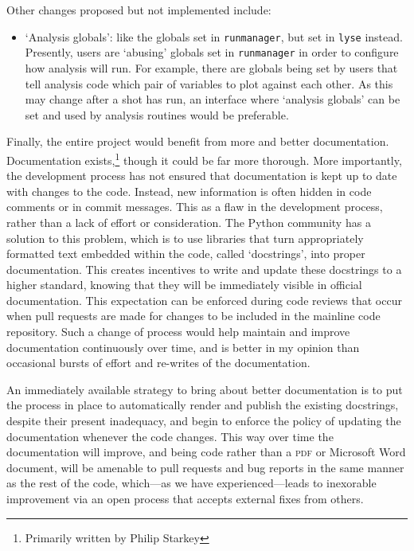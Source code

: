 Other changes proposed but not implemented include:

\begin{itemize}
\item `Analysis globals': like the globals set in \texttt{runmanager}, but set in \texttt{lyse} instead. Presently, users are `abusing' globals set in \texttt{runmanager} in order to configure how analysis will run. For example, there are globals being set by users that tell analysis code which pair of variables to plot against each other. As this may change after a shot has run, an interface where `analysis globals' can be set and used by analysis routines would be preferable.
\end{itemize}

Finally, the entire project would benefit from more and better documentation. Documentation exists,\footnote{Primarily written by Philip Starkey} though it could be far more thorough. More importantly, the development process has not ensured that documentation is kept up to date with changes to the code. Instead, new information is often hidden in code comments or in commit messages. This as a flaw in the development process, rather than a lack of effort or consideration. The Python community has a solution to this problem, which is to use libraries that turn appropriately formatted text embedded within the code, called `docstrings', into proper documentation. This creates incentives to write and update these docstrings to a higher standard, knowing that they will be immediately visible in official documentation. This expectation can be enforced during code reviews that occur when pull requests are made for changes to be included in the mainline code repository. Such a change of process would help maintain and improve documentation continuously over time, and is better in my opinion than occasional bursts of effort and re-writes of the documentation.

An immediately available strategy to bring about better documentation is to put the process in place to automatically render and publish the existing docstrings, despite their present inadequacy, and begin to enforce the policy of updating the documentation whenever the code changes. This way over time the documentation will improve, and being code rather than a \textsc{pdf} or Microsoft Word document, will be amenable to pull requests and bug reports in the same manner as the rest of the code, which---as we have experienced---leads to inexorable improvement via an open process that accepts external fixes from others.

